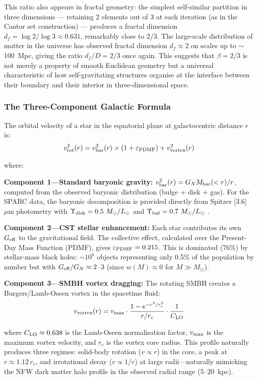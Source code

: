 \documentclass[11pt,a4paper]{article}
\begin{document}
This ratio also appears in fractal geometry: the simplest self-similar partition in three dimensions --- retaining 2 elements out of 3 at each iteration (as in the Cantor set construction) --- produces a fractal dimension $d_f = \log 2/\log 3 \approx 0.631$, remarkably close to $2/3$. The large-scale distribution of matter in the universe has observed fractal dimension $d_f \approx 2$ on scales up to $\sim$100~Mpc, giving the ratio $d_f/D = 2/3$ once again. This suggests that $\beta = 2/3$ is not merely a property of smooth Euclidean geometry but a universal characteristic of how self-gravitating structures organise at the interface between their boundary and their interior in three-dimensional space.

\subsubsection{The Three-Component Galactic Formula}

The orbital velocity of a star in the equatorial plane at galactocentric distance $r$ is:
\[v_{\rm tot}^2(r) = v_{\rm bar}^2(r) \times (1 + \varepsilon_{\rm PDMF}) + v_{\rm vortex}^2(r)\]

where:

\textbf{Component 1---Standard baryonic gravity:} $v_{\rm bar}^2(r) = G_N M_{\rm bar}(<r)/r$, computed from the observed baryonic distribution (bulge + disk + gas). For the SPARC data, the baryonic decomposition is provided directly from Spitzer [3.6]~$\mu$m photometry with $\Upsilon_{\rm disk} = 0.5~M_\odot/L_\odot$ and $\Upsilon_{\rm bul} = 0.7~M_\odot/L_\odot$ \cite{Schombert2019}.

\textbf{Component 2---CST stellar enhancement:} Each star contributes its own $G_{\rm eff}$ to the gravitational field. The collective effect, calculated over the Present-Day Mass Function (PDMF), gives $\varepsilon_{\rm PDMF} = 0.215$. This is dominated (76\%) by stellar-mass black holes: $\sim 10^8$ objects representing only 0.5\% of the population by number but with $G_{\rm eff}/G_N \approx 2$--3 (since $w(M) \approx 0$ for $M \gg M_\odot$).

\textbf{Component 3---SMBH vortex dragging:} The rotating SMBH creates a Burgers/Lamb-Oseen vortex in the spacetime fluid:
\[v_{\rm vortex}(r) = v_{\rm max} \cdot \frac{1 - e^{-r^2/r_c^2}}{r/r_c} \cdot \frac{1}{C_{\rm LO}}\]

where $C_{\rm LO} \approx 0.638$ is the Lamb-Oseen normalisation factor, $v_{\rm max}$ is the maximum vortex velocity, and $r_c$ is the vortex core radius. This profile naturally produces three regimes: solid-body rotation ($v \propto r$) in the core, a peak at $r \approx 1.12\,r_c$, and irrotational decay ($v \propto 1/r$) at large radii---naturally mimicking the NFW dark matter halo profile in the observed radial range (5--20~kpc).
\end{document}
